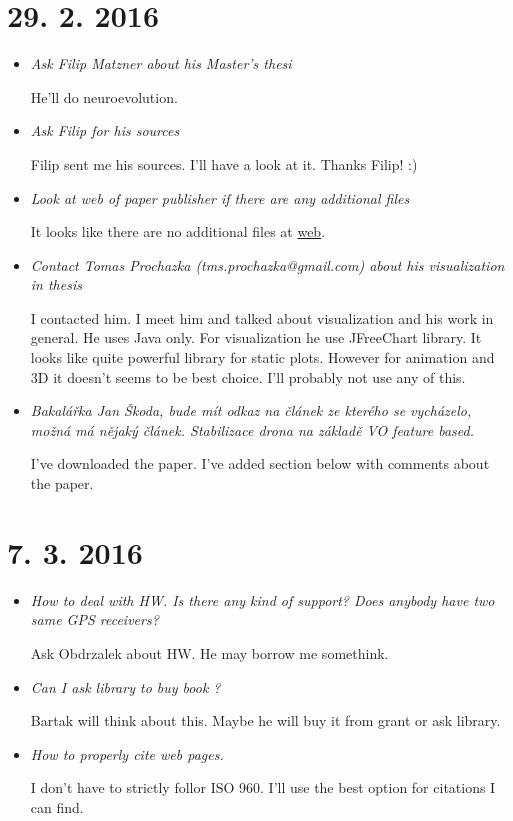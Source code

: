 \section{29. 2. 2016}
\begin{itemize}
\item \textit{Ask Filip Matzner about his Master's thesi}

He'll do neuroevolution.

\item \textit{Ask Filip for his sources}

Filip sent me his sources. I'll have a look at it. Thanks Filip! :)

\item \textit{Look at web of paper publisher if there are any additional files}

It looks like there are no additional files at \href{http://ieeexplore.ieee.org/xpl/abstractSimilar.jsp?arnumber=6631248&tag=1}{web}.


\item \textit{Contact Tomas Prochazka (tms.prochazka@gmail.com) about his visualization in thesis}

I contacted him. I meet him and talked about visualization and his work in general. He uses Java only. For visualization he use JFreeChart library. It looks like quite powerful library for static plots. However for animation and 3D it doesn't seems to be best choice. I'll probably not use any of this.

\item \textit{Bakalářka Jan Škoda, bude mít odkaz na článek ze kterého se vycházelo, možná má nějaký článek. Stabilizace drona na základě VO feature based.}

I've downloaded the paper. I've added section below with comments about the paper.

\end{itemize}

\section{7. 3. 2016}
\begin{itemize}
\item \textit{How to deal with HW. Is there any kind of support? Does anybody have two same GPS receivers?}

Ask Obdrzalek about HW. He may borrow me somethink.

\item \textit{Can I ask library to buy book \cite{titterton2004strapdown}?}

Bartak will think about this. Maybe he will buy it from grant or ask library.

\item \textit{How to properly cite web pages.}

I don't have to strictly follor ISO 960. I'll use the best option for citations I can find.

\end{itemize}








